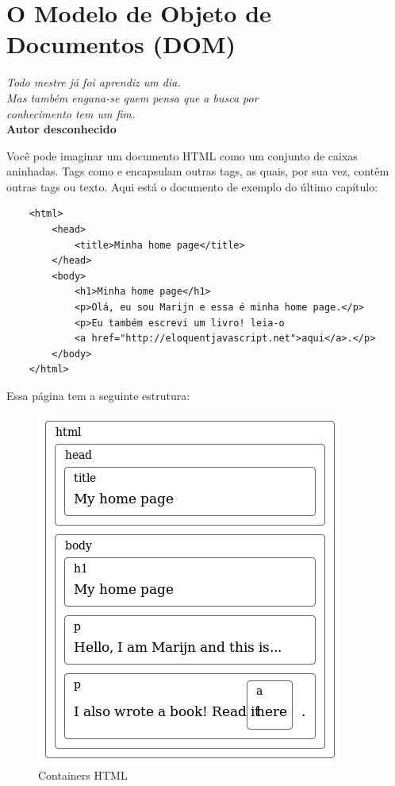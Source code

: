 \chapter{O Modelo de Objeto de Documentos (DOM)}

\begin{flushright}
  \textit{
    Todo mestre já foi aprendiz um dia. \\ Mas também engana-se quem pensa que a busca por \\  conhecimento tem um fim. 
  } \\
  
  \textbf{Autor desconhecido}
\end{flushright}

Você pode imaginar um documento HTML como um conjunto de caixas aninhadas. Tags como e encapsulam outras tags, as quais, por sua vez, contêm outras tags ou texto. Aqui está o documento de exemplo do último capítulo:

\begin{lstlisting}
	<html>
		<head>
			<title>Minha home page</title>
		</head>
		<body>
			<h1>Minha home page</h1>
			<p>Olá, eu sou Marijn e essa é minha home page.</p>
			<p>Eu também escrevi um livro! leia-o
			<a href="http://eloquentjavascript.net">aqui</a>.</p>
		</body>
	</html>
\end{lstlisting}

Essa página tem a seguinte estrutura:

\begin{figure}[H]
	\centering
	\includegraphics[scale=0.6]{imagens/html-boxes.jpg}
	\caption{Containers HTML}
\end{figure}

